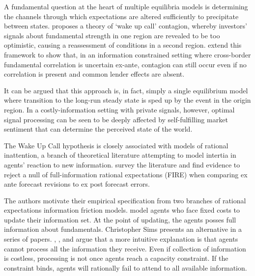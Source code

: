 \documentclass[../base.tex]{subfiles}
\begin{document}


A fundamental question at the heart of multiple equilibria models is determining the channels through which expectations are altered sufficiently to precipitate between states. \cite{goldstein1998asian} proposes a theory of `wake up call' contagion, whereby investors' signals about fundamental strength in one region are revealed to be too optimistic, causing a reassessment of conditions in a second region. \cite{ahnert2015wake} extend this framework to show that, in an information constrained setting where cross-border fundamental correlation is uncertain ex-ante, contagion can still occur even if no correlation is present and common lender effects are absent. 

It can be argued that this approach is, in fact, simply a single equilibrium model where transition to the long-run steady state is sped up by the event in the origin region. In a costly-information setting with private signals, however, optimal signal processing can be seen to be deeply affected by self-fulfilling market sentiment that can determine the perceived state of the world.

The Wake Up Call hypothesis is closely associated with models of rational inattention, a branch of theoretical literature attempting to model intertia in agents' reaction to new information.  \cite{coibion2010information} survey the literature and find evidence to reject a null of full-information rational expectations (FIRE) when comparing ex ante forecast revisions to ex post forecast errors. 

The authors motivate their empirical specification from two branches of rational expectations information friction models. \cite{NBERw8290} model agents who face fixed costs to update their information set. At the point of updating, the agents posses full information about fundamentals. Christopher Sims presents an alternative in a series of papers. \cite{sims1998stickiness}, \cite{sims2003implications}, and \cite{sims2006rational} argue that a more intuitive explanation is that agents cannot process all the information they receive. Even if collection of information is costless, processing is not once agents reach a capacity constraint. If the constraint binds, agents will rationally fail to attend to all available information. 
\end{document}
